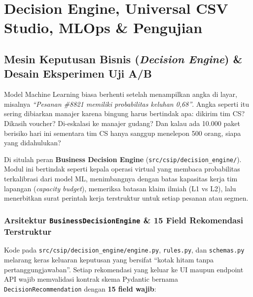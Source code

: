 \documentclass[11pt,a4paper,oneside]{book}
\newcommand{\code}[1]{{\small\nolinkurl{#1}}}
\begin{document}
\part{Decision Engine, Universal CSV Studio, MLOps \& Pengujian}

\chapter{Mesin Keputusan Bisnis (\emph{Decision Engine}) \& Desain Eksperimen Uji A/B}

\begin{bisnisbox}
Model Machine Learning biasa berhenti setelah menampilkan angka di layar, misalnya \emph{``Pesanan \#8821 memiliki probabilitas keluhan 0,68''}. Angka seperti itu sering dibiarkan manajer karena bingung harus bertindak apa: dikirim tim CS? Dikasih voucher? Di-eskalasi ke manajer gudang? Dan kalau ada 10.000 paket berisiko hari ini sementara tim CS hanya sanggup menelepon 500 orang, siapa yang didahulukan?

Di situlah peran \textbf{Business Decision Engine} (\code{src/csip/decision_engine/}). Modul ini bertindak seperti kepala operasi virtual yang membaca probabilitas terkalibrasi dari model ML, menimbangnya dengan batas kapasitas kerja tim lapangan (\emph{capacity budget}), memeriksa batasan klaim ilmiah (L1 vs L2), lalu menerbitkan surat perintah kerja terstruktur untuk setiap pesanan atau segmen.
\end{bisnisbox}

\section{Arsitektur \texttt{BusinessDecisionEngine} \& 15 Field Rekomendasi Terstruktur}

Kode pada \code{src/csip/decision_engine/engine.py}, \code{rules.py}, dan \code{schemas.py} melarang keras keluaran keputusan yang bersifat ``kotak hitam tanpa pertanggungjawaban''. Setiap rekomendasi yang keluar ke UI maupun endpoint API wajib memvalidasi kontrak skema Pydantic bernama \code{DecisionRecommendation} dengan \textbf{15 field wajib}:
\end{document}
